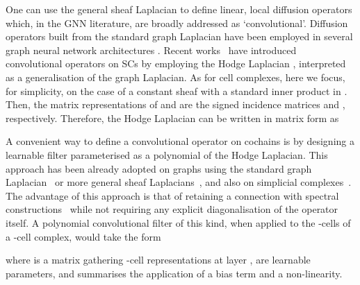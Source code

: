\documentclass{article}
\begin{document}
One can use the general sheaf Laplacian to define linear, local diffusion operators which, in the GNN literature, are broadly addressed as `convolutional'. Diffusion operators built from the standard graph Laplacian have been employed in several graph neural network architectures \citep{defferrard2016convolutional, kipf2017graph}. Recent works~\citep{ebli2020simplicial, bunch2020simplicial} have introduced convolutional operators on SCs by employing the Hodge Laplacian \citep{schaub2020random}, interpreted as a generalisation of the graph Laplacian. As for cell complexes, here we focus, for simplicity, on the case of a constant sheaf with a standard inner product in . Then, the matrix representations of  and  are the signed incidence matrices  and , respectively. Therefore, the Hodge Laplacian can be written in matrix form as  

A convenient way to define a convolutional operator on cochains is by designing a learnable filter parameterised as a polynomial of the Hodge Laplacian. This approach has been already adopted on graphs using the standard graph Laplacian~\citep{defferrard2016convolutional} or more general sheaf Laplacians~\citep{hansen2020sheaf}, and also on simplicial complexes~\citep{ebli2020simplicial}. The advantage of this approach is that of retaining a connection with spectral constructions~\citep{defferrard2016convolutional, ebli2020simplicial} while not requiring any explicit diagonalisation of the operator itself. A polynomial convolutional filter of this kind, when applied to the -cells of a -cell complex, would take the form

\noindent where  is a matrix gathering -cell representations at layer ,  are learnable parameters, and  summarises the application of a bias term and a non-linearity.
\end{document}
